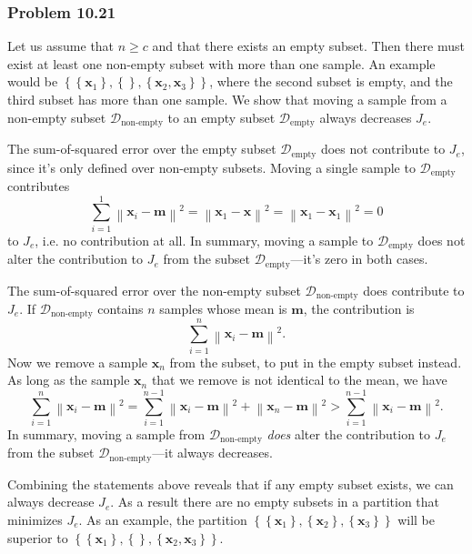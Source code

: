\documentclass[12pt, a4paper]{article}
\newcommand{\D}{\mathcal{D}}
\newcommand{\vect}[1]{\bm{#1}}
\newcommand{\norm}[1]{\left\lVert#1\right\rVert}
\begin{document}
{\subsubsection*{Problem 10.21}
Let us assume that $n \geq c$ and that there exists an empty subset.
Then there must exist at least one non-empty subset with more than one sample. 
An example would be $\left\{ \left\{ \vect{x}_1 \right\}, \left\{  \right\}, \left\{ \vect{x}_2, \vect{x}_3 \right\}  \right\}$, where the second subset is empty, and the third subset has more than one sample.
We show that moving a sample from a non-empty subset $\D_\text{non-empty}$ to an empty subset $\D_\text{empty}$ always decreases $J_e$.

The sum-of-squared error over the empty subset $\D_\text{empty}$ does not contribute to $J_e$, since it's only defined over non-empty subsets.
Moving a single sample to $\D_\text{empty}$ contributes 
\begin{equation*}
	\sum_{i=1}^{1} \norm{\vect{x}_i - \vect{m}}^2
	=
	\norm{\vect{x}_1 - \vect{x}}^2
	=
	\norm{\vect{x}_1 - \vect{x}_1}^2
	=
	0
\end{equation*}
to $J_e$, i.e. no contribution at all.
In summary, moving a sample to $\D_\text{empty}$ does not alter the contribution to $J_e$ from the subset $\D_\text{empty}$---it's zero in both cases.

The sum-of-squared error over the non-empty subset $\D_\text{non-empty}$ does contribute to $J_e$.
If $\D_\text{non-empty}$ contains $n$ samples whose mean is $\vect{m}$, the contribution is
\begin{equation*}
\sum_{i=1}^{n} \norm{\vect{x}_i - \vect{m}}^2.
\end{equation*}
Now we remove a sample $\vect{x}_n$ from the subset, to put in the empty subset instead.
As long as the sample $\vect{x}_n$ that we remove is not identical to the mean, we have
\begin{equation*}
	\sum_{i=1}^{n} \norm{\vect{x}_i - \vect{m}}^2
	=
	\sum_{i=1}^{n-1} \norm{\vect{x}_i - \vect{m}}^2
	+ \norm{\vect{x}_n - \vect{m}}^2
	 > 
	 \sum_{i=1}^{n-1} \norm{\vect{x}_i - \vect{m}}^2.
\end{equation*}
In summary, moving a sample from $\D_\text{non-empty}$ \emph{does} alter the contribution to $J_e$ from the subset $\D_\text{non-empty}$---it always decreases.

Combining the statements above reveals that if any empty subset exists, we can always decrease $J_e$.
As a result there are no empty subsets in a partition that minimizes $J_e$.
As an example, the partition $\left\{ \left\{ \vect{x}_1 \right\}, \left\{ \vect{x}_2 \right\}, \left\{ \vect{x}_3 \right\}  \right\}$ will be superior to $\left\{ \left\{ \vect{x}_1 \right\}, \left\{  \right\}, \left\{ \vect{x}_2, \vect{x}_3 \right\}  \right\}$.


}
\end{document}

